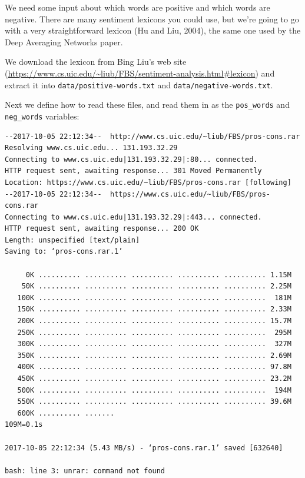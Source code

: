 \documentclass[]{book}
\newenvironment{Shaded}{\begin{snugshade}}{\end{snugshade}}
\newcommand{\FunctionTok}[1]{\textcolor[rgb]{0.00,0.00,0.00}{#1}}
\newcommand{\BuiltInTok}[1]{#1}
\newcommand{\ExtensionTok}[1]{#1}
\newcommand{\NormalTok}[1]{#1}
\theoremstyle{definition}
\theoremstyle{definition}
\theoremstyle{definition}
\theoremstyle{remark}
\begin{document}
We need some input about which words are positive and which words are
negative. There are many sentiment lexicons you could use, but we're
going to go with a very straightforward lexicon (Hu and Liu, 2004), the
same one used by the Deep Averaging Networks paper.

We download the lexicon from Bing Liu's web site
(\url{https://www.cs.uic.edu/~liub/FBS/sentiment-analysis.html\#lexicon})
and extract it into \texttt{data/positive-words.txt} and
\texttt{data/negative-words.txt}.

Next we define how to read these files, and read them in as the
\texttt{pos\_words} and \texttt{neg\_words} variables:

\begin{Shaded}
\end{Shaded}

\begin{verbatim}
--2017-10-05 22:12:34--  http://www.cs.uic.edu/~liub/FBS/pros-cons.rar
Resolving www.cs.uic.edu... 131.193.32.29
Connecting to www.cs.uic.edu|131.193.32.29|:80... connected.
HTTP request sent, awaiting response... 301 Moved Permanently
Location: https://www.cs.uic.edu/~liub/FBS/pros-cons.rar [following]
--2017-10-05 22:12:34--  https://www.cs.uic.edu/~liub/FBS/pros-cons.rar
Connecting to www.cs.uic.edu|131.193.32.29|:443... connected.
HTTP request sent, awaiting response... 200 OK
Length: unspecified [text/plain]
Saving to: ‘pros-cons.rar.1’

     0K .......... .......... .......... .......... .......... 1.15M
    50K .......... .......... .......... .......... .......... 2.25M
   100K .......... .......... .......... .......... ..........  181M
   150K .......... .......... .......... .......... .......... 2.33M
   200K .......... .......... .......... .......... .......... 15.7M
   250K .......... .......... .......... .......... ..........  295M
   300K .......... .......... .......... .......... ..........  327M
   350K .......... .......... .......... .......... .......... 2.69M
   400K .......... .......... .......... .......... .......... 97.8M
   450K .......... .......... .......... .......... .......... 23.2M
   500K .......... .......... .......... .......... ..........  194M
   550K .......... .......... .......... .......... .......... 39.6M
   600K .......... .......                                      109M=0.1s

2017-10-05 22:12:34 (5.43 MB/s) - ‘pros-cons.rar.1’ saved [632640]

bash: line 3: unrar: command not found
\end{verbatim}
\end{document}
